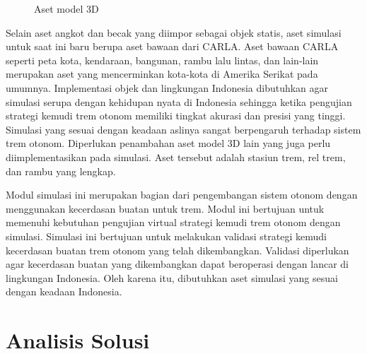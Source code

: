 \begin{figure}[!tb]
	\hfill
	\hfill
	\caption{Aset model 3D \parencite{rispro-trilaksono}}
	\label{fig:3d-model-assets}
\end{figure}

Selain aset angkot dan becak yang diimpor sebagai objek statis, aset simulasi
untuk saat ini baru berupa aset bawaan dari CARLA. Aset bawaan CARLA seperti
peta kota, kendaraan, bangunan, rambu lalu lintas, dan lain-lain merupakan aset
yang mencerminkan kota-kota di Amerika Serikat pada umumnya. Implementasi objek
dan lingkungan Indonesia dibutuhkan agar simulasi serupa dengan kehidupan nyata
di Indonesia sehingga ketika pengujian strategi kemudi trem otonom memiliki
tingkat akurasi dan presisi yang tinggi. Simulasi yang sesuai dengan keadaan
aslinya sangat berpengaruh terhadap sistem trem otonom. Diperlukan penambahan
aset model 3D lain yang juga perlu diimplementasikan pada simulasi. Aset
tersebut adalah stasiun trem, rel trem, dan rambu yang lengkap.

Modul simulasi ini merupakan bagian dari pengembangan sistem otonom dengan
menggunakan kecerdasan buatan untuk trem. Modul ini bertujuan untuk memenuhi
kebutuhan pengujian virtual strategi kemudi trem otonom dengan simulasi.
Simulasi ini bertujuan untuk melakukan validasi strategi kemudi kecerdasan
buatan trem otonom yang telah dikembangkan. Validasi diperlukan agar kecerdasan
buatan yang dikembangkan dapat beroperasi dengan lancar di lingkungan Indonesia.
Oleh karena itu, dibutuhkan aset simulasi yang sesuai dengan keadaan Indonesia.

\section{Analisis Solusi}

